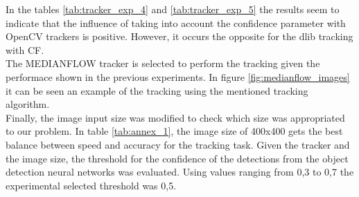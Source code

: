 In the tables \ref{tab:tracker_exp_4} and \ref{tab:tracker_exp_5} the results seem to indicate that the influence of taking into account the confidence parameter with OpenCV trackers is positive. However, it occurs the opposite for the dlib tracking with CF.\\
The MEDIANFLOW tracker is selected to perform the tracking given the performace shown in the previous experiments. In figure \ref{fig:medianflow_images} it can be seen an example of the tracking using the mentioned tracking algorithm.\\
Finally, the image input size was modified to check which size was appropriated to our problem. In table \ref{tab:annex_1}, the image size of 400x400 gets the best balance between speed and accuracy for the tracking task. Given the tracker and the image size, the threshold for the confidence of the detections from the object detection neural networks was evaluated. Using values ranging from 0,3 to 0,7 the experimental selected threshold was 0,5.
